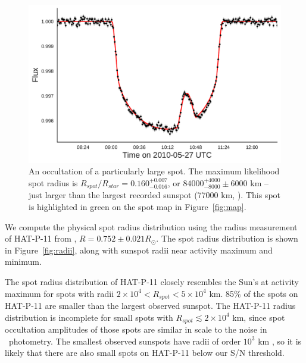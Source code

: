 \begin{figure}
\includegraphics[scale=0.45]{stsp_hat_p_11/lc_071.pdf}
\caption{An occultation of a particularly large spot. The maximum likelihood spot radius is $R_{spot}/R_{star} = 0.160_{-0.016}^{+0.007}$, or $84000^{+4000}_{-8000}\pm 6000$ km -- just larger than the largest recorded sunspot (77000 km, \citealt{Newton1955}). This spot is highlighted in green on the spot map in Figure~\ref{fig:map}.}
\label{fig:transit_071}
\end{figure}

We compute the physical spot radius distribution using the radius measurement of HAT-P-11 from \citet{bakos2010}, $R=0.752 \pm 0.021 R_\odot$. The spot radius distribution is shown in Figure~\ref{fig:radii}, along with sunspot radii near activity maximum and minimum. 

The spot radius distribution of HAT-P-11 closely resembles the Sun's at activity maximum for spots with radii $2\times 10^4 < R_{spot} < 5 \times 10^4$ km. 85\% of the spots on HAT-P-11 are smaller than the largest observed sunspot. The HAT-P-11 radius distribution is incomplete for small spots with $R_{spot} \lesssim 2 \times 10^4$ km, since spot occultation amplitudes of those spots are similar in scale to the noise in \kepler\ photometry. The smallest observed sunspots have radii of order $10^3$ km \citep{Solanki2003}, so it is likely that there are also small spots on HAT-P-11 below our S/N threshold.

